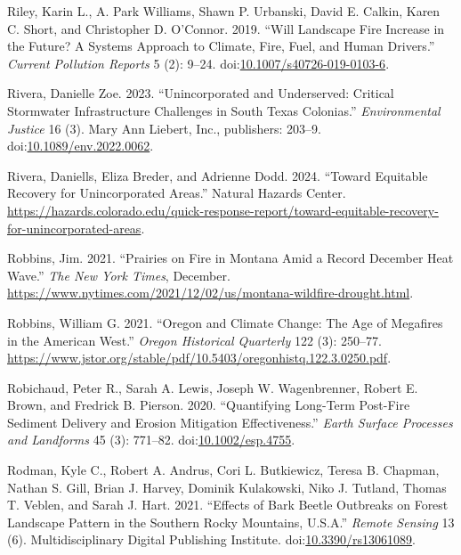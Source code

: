 \documentclass[
]{article}
\newlength{\cslhangindent}
\newenvironment{CSLReferences}[2] %
 {\begin{list}{}{%
  \setlength{\itemindent}{0pt}
  \setlength{\leftmargin}{0pt}
  \setlength{\parsep}{0pt}
  \ifodd #1
   \setlength{\leftmargin}{\cslhangindent}
   \setlength{\itemindent}{-1\cslhangindent}
  \fi
  \setlength{\itemsep}{#2\baselineskip}}}
 {\end{list}}
\begin{document}
\begin{CSLReferences}{1}{0}
Riley, Karin L., A. Park Williams, Shawn P. Urbanski, David E. Calkin, Karen C. Short, and Christopher D. O'Connor. 2019. {``Will {Landscape Fire Increase} in the {Future}? {A Systems Approach} to {Climate}, {Fire}, {Fuel}, and {Human Drivers}.''} \emph{Current Pollution Reports} 5 (2): 9--24. doi:\href{https://doi.org/10.1007/s40726-019-0103-6}{10.1007/s40726-019-0103-6}.

Rivera, Danielle Zoe. 2023. {``Unincorporated and {Underserved}: {Critical Stormwater Infrastructure Challenges} in {South Texas Colonias}.''} \emph{Environmental Justice} 16 (3). Mary Ann Liebert, Inc., publishers: 203--9. doi:\href{https://doi.org/10.1089/env.2022.0062}{10.1089/env.2022.0062}.

Rivera, Daniells, Eliza Breder, and Adrienne Dodd. 2024. {``Toward {Equitable Recovery} for {Unincorporated Areas}.''} Natural Hazards Center. \url{https://hazards.colorado.edu/quick-response-report/toward-equitable-recovery-for-unincorporated-areas}.

Robbins, Jim. 2021. {``Prairies on {Fire} in {Montana Amid} a {Record December Heat Wave}.''} \emph{The New York Times}, December. \url{https://www.nytimes.com/2021/12/02/us/montana-wildfire-drought.html}.

Robbins, William G. 2021. {``Oregon and {Climate Change}: {The Age} of {Megafires} in the {American West}.''} \emph{Oregon Historical Quarterly} 122 (3): 250--77. \url{https://www.jstor.org/stable/pdf/10.5403/oregonhistq.122.3.0250.pdf}.

Robichaud, Peter R., Sarah A. Lewis, Joseph W. Wagenbrenner, Robert E. Brown, and Fredrick B. Pierson. 2020. {``Quantifying Long-Term Post-Fire Sediment Delivery and Erosion Mitigation Effectiveness.''} \emph{Earth Surface Processes and Landforms} 45 (3): 771--82. doi:\href{https://doi.org/10.1002/esp.4755}{10.1002/esp.4755}.

Rodman, Kyle C., Robert A. Andrus, Cori L. Butkiewicz, Teresa B. Chapman, Nathan S. Gill, Brian J. Harvey, Dominik Kulakowski, Niko J. Tutland, Thomas T. Veblen, and Sarah J. Hart. 2021. {``Effects of {Bark Beetle Outbreaks} on {Forest Landscape Pattern} in the {Southern Rocky Mountains}, {U}.{S}.{A}.''} \emph{Remote Sensing} 13 (6). Multidisciplinary Digital Publishing Institute. doi:\href{https://doi.org/10.3390/rs13061089}{10.3390/rs13061089}.


\end{CSLReferences}
\end{document}
